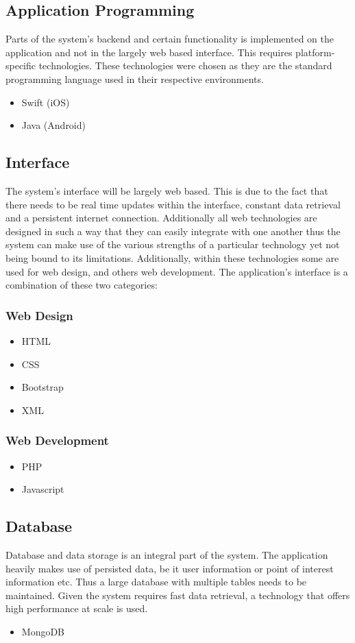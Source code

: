 \documentclass{article}
\begin{document}
	\subsection{Application Programming}
Parts of the system's backend and certain functionality is implemented on the application and not in the largely web based interface.  This requires platform-specific technologies. These technologies were chosen as they are the standard programming language used in their respective environments.
		\begin{itemize}
			\item Swift (iOS)
			\item Java (Android)
		\end{itemize}
	\subsection{Interface}
The system's interface will be largely web based. This is due to the fact that there needs to be real time updates within the interface, constant data retrieval and a persistent internet connection.  Additionally all web technologies are designed in such a way that they can easily integrate with one another thus the system can make use of the various strengths of a particular technology yet not being bound to its limitations.  Additionally, within these technologies some are used for web design, and others web development.  The application's interface is a combination of these two categories:
		\subsubsection{Web Design}
			\begin{itemize}
				\item HTML
				\item CSS
				\item Bootstrap
				\item XML
			\end{itemize}
		\subsubsection{Web Development}
			\begin{itemize}
				\item PHP
				\item Javascript
			\end{itemize}
	\subsection{Database}
Database and data storage is an integral part of the system.  The application heavily makes use of persisted data, be it user information or point of interest information etc.  Thus a large database with multiple tables needs to be maintained.  Given the system requires fast data retrieval, a technology that offers high performance at scale is used.
		\begin{itemize}
			\item MongoDB
		\end{itemize}
\end{document}
